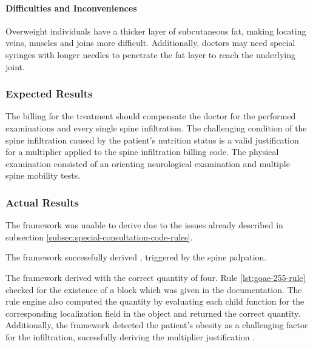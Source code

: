 \paragraph{Difficulties and Inconveniences}
Overweight individuals have a thicker layer of subcutaneous fat, making locating veins, muscles and joins more difficult.
Additionally, doctors may need special syringes with longer needles to penetrate the fat layer to reach the underlying joint.


\subsubsection{Expected Results}
The billing for the treatment should compensate the doctor for the performed examinations and every single spine infiltration.
The challenging condition of the spine infiltration caused by the patient's nutrition status is a valid justification for a multiplier applied to the spine infiltration billing code.
The physical examination consisted of an orienting neurological examination and multiple spine mobility tests.


\subsubsection{Actual Results}
The framework was unable to derive  due to the issues already described in subsection \ref{subsec:special-consultation-code-rules}.

The framework successfully derived , triggered by the spine palpation.

The framework derived  with the correct quantity of four.
Rule \ref{lst:goae-255-rule} checked for the existence of a  block which was given in the documentation.
The rule engine also computed the quantity by evaluating each child function for the corresponding localization field in the  object and returned the correct quantity.
Additionally, the framework detected the patient's obesity as a challenging factor for the infiltration,
sucessfully deriving the multiplier justification \addref.







